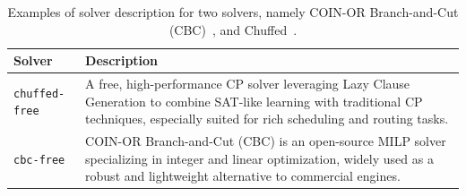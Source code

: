 \documentclass[../../main]{subfiles}
\begin{document}
\begin{table}[!ht]
    \centering
    \begin{tabular}{@{}l p{}@{}}
    \hline
        Solver & Description \\ \hline
        \texttt{chuffed-free} & A free, high-performance CP solver leveraging Lazy Clause Generation to combine SAT-like learning with traditional CP techniques, especially suited for rich scheduling and routing tasks. \\
        \texttt{cbc-free} & COIN-OR Branch-and-Cut (CBC) is an open-source MILP solver specializing in integer and linear optimization, widely used as a robust and lightweight alternative to commercial engines. \\ \hline
    \end{tabular}
    \caption{Examples of solver description for two solvers, namely COIN-OR Branch-and-Cut (CBC)~\cite{cbc}, and Chuffed~\cite{chuffed}.}
    \label{tab:sDescEx}
\end{table}

\begin{table}[!ht]
    \centering
    \caption{Parallel-solver evaluation results for the five best-performing LLMs on sanitized scripts augmented with solver descriptions, using a multi-turn prompt setup. Column definitions are as given in .}
    \label{tab:sDesc3}
\end{table}
\end{document}
